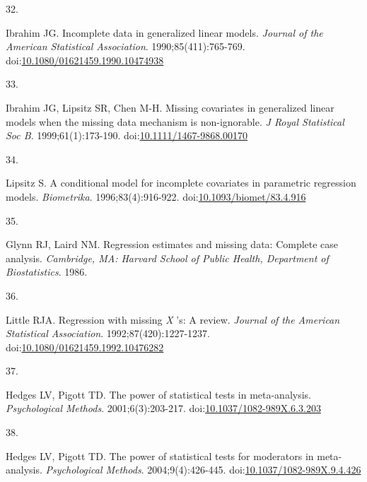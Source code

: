 \documentclass[
]{article}
\newlength{\cslhangindent}
\newlength{\csllabelwidth}
\newlength{\cslentryspacingunit} %
\newenvironment{CSLReferences}[2] %
 {%
  \setlength{\parindent}{0pt}
  \ifodd #1
  \let\oldpar\par
  \def\par{\hangindent=\cslhangindent\oldpar}
  \fi
  \setlength{\parskip}{#2\cslentryspacingunit}
 }%
 {}
\newcommand{\CSLLeftMargin}[1]{\parbox[t]{\csllabelwidth}{#1}}
\newcommand{\CSLRightInline}[1]{\parbox[t]{\linewidth - \csllabelwidth}{#1}\break}
\begin{document}
\begin{CSLReferences}{0}{0}
\leavevmode{}%
\CSLLeftMargin{32. }
\CSLRightInline{Ibrahim JG. Incomplete data in generalized linear models. \emph{Journal of the American Statistical Association}. 1990;85(411):765-769. doi:\href{https://doi.org/10.1080/01621459.1990.10474938}{10.1080/01621459.1990.10474938}}

\leavevmode{}%
\CSLLeftMargin{33. }
\CSLRightInline{Ibrahim JG, Lipsitz SR, Chen M-H. Missing covariates in generalized linear models when the missing data mechanism is non-ignorable. \emph{J Royal Statistical Soc B}. 1999;61(1):173-190. doi:\href{https://doi.org/10.1111/1467-9868.00170}{10.1111/1467-9868.00170}}

\leavevmode{}%
\CSLLeftMargin{34. }
\CSLRightInline{Lipsitz S. A conditional model for incomplete covariates in parametric regression models. \emph{Biometrika}. 1996;83(4):916-922. doi:\href{https://doi.org/10.1093/biomet/83.4.916}{10.1093/biomet/83.4.916}}

\leavevmode{}%
\CSLLeftMargin{35. }
\CSLRightInline{Glynn RJ, Laird NM. Regression estimates and missing data: Complete case analysis. \emph{Cambridge, MA: Harvard School of Public Health, Department of Biostatistics}. 1986.}

\leavevmode{}%
\CSLLeftMargin{36. }
\CSLRightInline{Little RJA. Regression with missing \emph{X} 's: A review. \emph{Journal of the American Statistical Association}. 1992;87(420):1227-1237. doi:\href{https://doi.org/10.1080/01621459.1992.10476282}{10.1080/01621459.1992.10476282}}

\leavevmode{}%
\CSLLeftMargin{37. }
\CSLRightInline{Hedges LV, Pigott TD. The power of statistical tests in meta-analysis. \emph{Psychological Methods}. 2001;6(3):203-217. doi:\href{https://doi.org/10.1037/1082-989X.6.3.203}{10.1037/1082-989X.6.3.203}}

\leavevmode{}%
\CSLLeftMargin{38. }
\CSLRightInline{Hedges LV, Pigott TD. The power of statistical tests for moderators in meta-analysis. \emph{Psychological Methods}. 2004;9(4):426-445. doi:\href{https://doi.org/10.1037/1082-989X.9.4.426}{10.1037/1082-989X.9.4.426}}


\end{CSLReferences}
\end{document}
